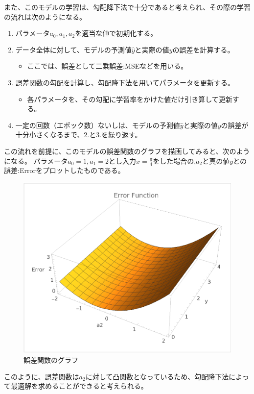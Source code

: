 \documentclass{article}[jsarticle]
\begin{document}
    また、このモデルの学習は、勾配降下法で十分であると考えられ、その際の学習の流れは次のようになる。
    \begin{enumerate}
        \item パラメータ$a_0, a_1, a_2$を適当な値で初期化する。
        \item データ全体に対して、モデルの予測値$\hat{y}$と実際の値$y$の誤差を計算する。
        \begin{itemize}
            \item ここでは、誤差として二乗誤差:MSEなどを用いる。
        \end{itemize}
        \item 誤差関数の勾配を計算し、勾配降下法を用いてパラメータを更新する。
        \begin{itemize}
            \item 各パラメータを、その勾配に学習率をかけた値だけ引き算して更新する。
        \end{itemize}
        \item 一定の回数（エポック数）ないしは、モデルの予測値$\hat{y}$と実際の値$y$の誤差が十分小さくなるまで、2.と3.を繰り返す。
    \end{enumerate}
    この流れを前提に、このモデルの誤差関数のグラフを描画してみると、次のようになる。
    パラメータ$a_0 = 1, a_1 = 2$とし入力$x = \frac{\pi}{4}$をした場合の,$a_2$と真の値$y$との誤差:Errorをプロットしたものである。
    \begin{figure}[H]
        \centering
        \includegraphics[scale=0.5]{./f49644b9-0517-420e-bf51-78b21e18f0ac.png}
        \caption{誤差関数のグラフ}
    \end{figure}
    このように、誤差関数は$a_2$に対して凸関数となっているため、勾配降下法によって最適解を求めることができると考えられる。
\end{document}
